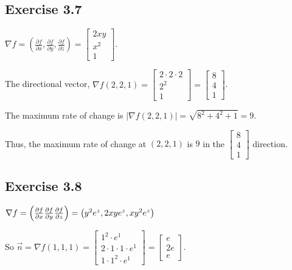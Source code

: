 \subsection*{Exercise 3.7}

$\nabla f = \left( \frac{\partial f}{\partial x}, \frac{\partial f}{\partial y}, \frac{\partial f}{\partial z} \right) = \begin{bmatrix} 2xy \\ x^2 \\ 1 \end{bmatrix}$. 

The directional vector, $\nabla f(2, 2, 1) = \begin{bmatrix} 2 \cdot 2 \cdot 2 \\ 2^2 \\ 1 \end{bmatrix} = \begin{bmatrix} 8 \\ 4 \\ 1 \end{bmatrix}$. 

The maximum rate of change is $| \nabla f(2, 2, 1) | = \sqrt{8^2 + 4^2 + 1} = 9$. 

Thus, the maximum rate of change at $(2, 2, 1)$ is $9$ in the $\begin{bmatrix} 8 \\ 4 \\ 1 \end{bmatrix}$ direction. 

\subsection*{Exercise 3.8}

$\nabla f  = \left( \frac{\partial f}{\partial x} \\ \frac{\partial f}{\partial y} \\ \frac{\partial f}{\partial z} \right) = \left( y^2e^z, 2xye^z, xy^2e^z \right)$

So $\vec{n} = \nabla f(1,1,1) = \begin{bmatrix} 1^2 \cdot e^1 \\ 2 \cdot 1 \cdot 1 \cdot e^1 \\ 1 \cdot 1^2 \cdot e^1 \end{bmatrix} = \begin{bmatrix} e \\ 2e \\ e \end{bmatrix}$.

